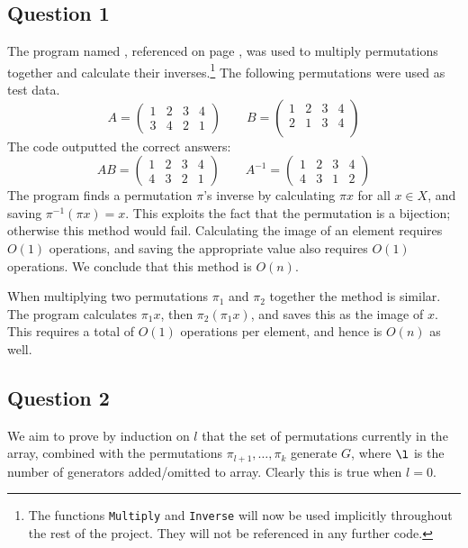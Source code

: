 \documentclass[10pt,a4paper,notitlepage]{article}
\begin{document}
\subsection*{\centering Question 1}
The program named , referenced on page \pageref{cd:1}, was used to multiply permutations together and calculate their inverses.\footnote{The functions \texttt{Multiply} and \texttt{Inverse} will now be used implicitly throughout the rest of the project. They will not be referenced in any further code.} The following permutations were used as test data.
\begin{equation*}
A=\begin{pmatrix}
1&2&3&4\\
3&4&2&1
\end{pmatrix} \quad\quad
B=\begin{pmatrix}
1&2&3&4\\
2&1&3&4\\
\end{pmatrix}
\end{equation*}
The code outputted the correct answers:
\begin{equation*}
AB=\begin{pmatrix}
1&2&3&4\\
4&3&2&1
\end{pmatrix}
\quad\quad
A^{-1}=\begin{pmatrix}
1&2&3&4\\
4&3&1&2
\end{pmatrix}
\end{equation*}
The program finds a permutation $\pi$'s inverse by calculating $\pi x$ for all $x\in X$, and saving $\pi^{-1}(\pi x)=x$. This exploits the fact that the permutation is a bijection; otherwise this method would fail. Calculating the image of an element requires $O(1)$ operations, and saving the appropriate value also requires $O(1)$ operations. We conclude that this method is $O(n)$.

When multiplying two permutations $\pi_{1}$ and $\pi_{2}$ together the method is similar. The program calculates $\pi_{1}x$, then $\pi_{2}(\pi_{1}x)$, and saves this as the image of $x$. This requires a total of $O(1)$ operations per element, and hence is $O(n)$ as well.

\subsection*{\centering Question 2}
We aim to prove by induction on $l$ that the set of permutations currently in the array, combined with the permutations $\pi_{l+1},\hdots,\pi_{k}$ generate $G$, where $\l$ is the number of generators added/omitted to array. Clearly this is true when $l=0$.
\end{document}

